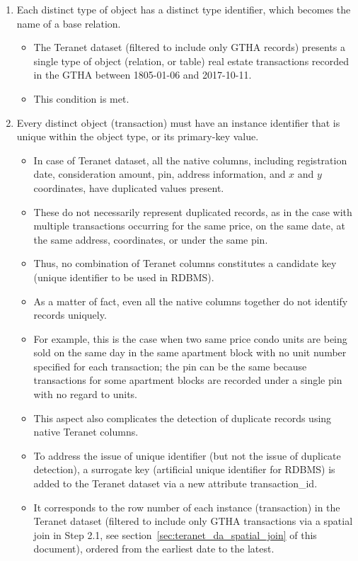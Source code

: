 \begin{enumerate}
    \item Each distinct type of object has a distinct type identifier, which becomes the name of a base relation.
    \begin{itemize}
        \item The Teranet dataset (filtered to include only GTHA records) presents a single type of object (relation, or table) \textemdash real estate transactions recorded in the GTHA between 1805-01-06 and 2017-10-11.
        \item This condition is met.
    \end{itemize}
    \item Every distinct object (transaction) must have an instance identifier that is unique within the object type, or its primary-key value.
    \begin{itemize}
        \item In case of Teranet dataset, all the native columns, including registration date, consideration amount, pin, address information, and $x$ and $y$ coordinates, have duplicated values present.
        \item These do not necessarily represent duplicated records, as in the case with multiple transactions occurring for the same price, on the same date, at the same address, coordinates, or under the same pin.
        \item Thus, no combination of Teranet columns constitutes a candidate key (unique identifier to be used in RDBMS).
        \item As a matter of fact, even all the native columns together do not identify records uniquely.
        \item For example, this is the case when two same price condo units are being sold on the same day in the same apartment block with no unit number specified for each transaction;
        the pin can be the same because transactions for some apartment blocks are recorded under a single pin with no regard to units.
        \item This aspect also complicates the detection of duplicate records using native Teranet columns.
        \item To address the issue of unique identifier (but not the issue of duplicate detection), a surrogate key (artificial unique identifier for RDBMS) is added to the Teranet dataset via a new attribute transaction\_id.
        \item It corresponds to the row number of each instance (transaction) in the Teranet dataset (filtered to include only GTHA transactions via a spatial join in Step 2.1, see section~\ref{sec:teranet_da_spatial_join} of this document), ordered from the earliest date to the latest.

\end{itemize}
\end{enumerate}
